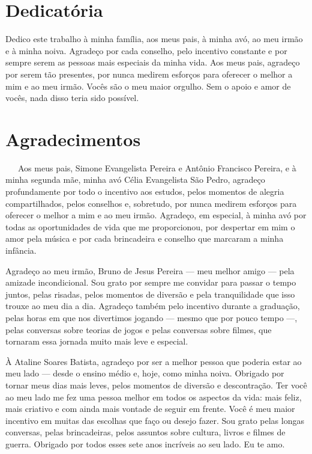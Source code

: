 \documentclass[
  12pt,
  a4paper,
]{scrreprt}
\begin{document}
\chapter*{\centering Dedicatória}
\thispagestyle{empty}

\vfill

\hfill \parbox{8cm}{\hspace{0.4cm} Dedico este trabalho à minha família, aos meus pais, à minha avó, ao meu irmão e à minha noiva. Agradeço por cada conselho, pelo incentivo constante e por sempre serem as pessoas mais especiais da minha vida. Aos meus pais, agradeço por serem tão presentes, por nunca medirem esforços para oferecer o melhor a mim e ao meu irmão. Vocês são o meu maior orgulho. Sem o apoio e amor de vocês, nada disso teria sido possível.}

\vfill

\begingroup
\pagestyle{empty}
\chapter*{\centering Agradecimentos}
\thispagestyle{empty}

~~~Aos meus pais, Simone Evangelista Pereira e Antônio Francisco
Pereira, e à minha segunda mãe, minha avó Célia Evangelista São Pedro,
agradeço profundamente por todo o incentivo aos estudos, pelos momentos
de alegria compartilhados, pelos conselhos e, sobretudo, por nunca
medirem esforços para oferecer o melhor a mim e ao meu irmão. Agradeço,
em especial, à minha avó por todas as oportunidades de vida que me
proporcionou, por despertar em mim o amor pela música e por cada
brincadeira e conselho que marcaram a minha infância.

\vspace{12pt}

Agradeço ao meu irmão, Bruno de Jesus Pereira --- meu melhor amigo ---
pela amizade incondicional. Sou grato por sempre me convidar para passar
o tempo juntos, pelas risadas, pelos momentos de diversão e pela
tranquilidade que isso trouxe ao meu dia a dia. Agradeço também pelo
incentivo durante a graduação, pelas horas em que nos divertimos jogando
--- mesmo que por pouco tempo ---, pelas conversas sobre teorias de
jogos e pelas conversas sobre filmes, que tornaram essa jornada muito
mais leve e especial.

\vspace{12pt}

À Ataline Soares Batista, agradeço por ser a melhor pessoa que poderia
estar ao meu lado --- desde o ensino médio e, hoje, como minha noiva.
Obrigado por tornar meus dias mais leves, pelos momentos de diversão e
descontração. Ter você ao meu lado me fez uma pessoa melhor em todos os
aspectos da vida: mais feliz, mais criativo e com ainda mais vontade de
seguir em frente. Você é meu maior incentivo em muitas das escolhas que
faço ou desejo fazer. Sou grato pelas longas conversas, pelas
brincadeiras, pelos assuntos sobre cultura, livros e filmes de guerra.
Obrigado por todos esses sete anos incríveis ao seu lado. Eu te amo.
\end{document}
